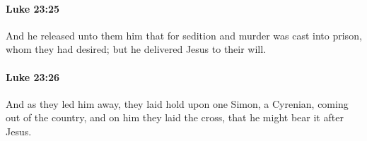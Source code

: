 		\paragraph{Luke 23:25} %
			\label{LUKE-23-25}

			And he released unto them him that for sedition and murder was cast into prison, whom they had desired; but he delivered Jesus to their will.

			\begin{framed}
			\scriptsize
				\begin{compactdesc}
					\item[SBLG] 
				\end{compactdesc}
			\end{framed}

		\paragraph{Luke 23:26} %
			\label{LUKE-23-26}

			And as they led him away, they laid hold upon one Simon, a Cyrenian, coming out of the country, and on him they laid the cross, that he might bear it after Jesus.

